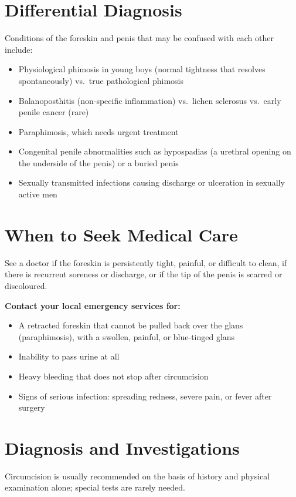 \section*{Differential Diagnosis}
Conditions of the foreskin and penis that may be confused with each other include:

\begin{itemize}
    \item Physiological phimosis in young boys (normal tightness that resolves spontaneously) vs.\ true pathological phimosis
    \item Balanoposthitis (non-specific inflammation) vs.\ lichen sclerosus vs.\ early penile cancer (rare)
    \item Paraphimosis, which needs urgent treatment
    \item Congenital penile abnormalities such as hypospadias (a urethral opening on the underside of the penis) or a buried penis
    \item Sexually transmitted infections causing discharge or ulceration in sexually active men
\end{itemize}

\section*{When to Seek Medical Care}
See a doctor if the foreskin is persistently tight, painful, or difficult to clean, if there is recurrent soreness or discharge, or if the tip of the penis is scarred or discoloured.

\textbf{Contact your local emergency services for:}
\begin{itemize}
    \item A retracted foreskin that cannot be pulled back over the glans (paraphimosis), with a swollen, painful, or blue-tinged glans
    \item Inability to pass urine at all
    \item Heavy bleeding that does not stop after circumcision
    \item Signs of serious infection: spreading redness, severe pain, or fever after surgery
\end{itemize}

\section*{Diagnosis and Investigations}
Circumcision is usually recommended on the basis of history and physical examination alone; special tests are rarely needed.

